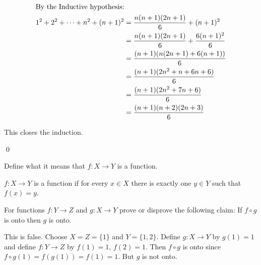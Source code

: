 \documentclass[addpoints,12pt]{exam}
\begin{document}
\begin{questions}
\begin{solution}
    \begin{align*}
      \intertext{By the Inductive hypothesis:}
      1^2 + 2^2 + \dots + n^2 + (n+1)^2 &= \frac{n(n+1)(2n+1)}{6} + (n+1)^2\\
      &= \frac{n(n+1)(2n+1)}{6} + \frac{6(n+1)^2}{6}\\
      &= \frac{(n+1) (n (2n+1) + 6(n+1))}{6}\\
      &= \frac{(n+1) (2n^2 + n + 6 n + 6)}{6}\\
      &= \frac{(n+1) (2n^2 + 7n + 6)}{6}\\
      &= \frac{(n+1)(n+2)(2n+3)}{6}
    \end{align*}

    This closes the induction.

    \qed
  \end{solution}

  \question[5] Define what it means that $f:X\to Y$ is a function.
  \vspace*{2cm}
  \begin{solution}
    $f:X\to Y$ is a function if for every $x\in X$ there is exactly one $y\in Y$
    such that $f(x) = y$.
  \end{solution}

  \question[10] For functions $f:Y\to Z$ and $g:X\to Y$ prove or disprove the
  following claim: If $f\circ g$ is onto then $g$ is onto.
  \begin{solution}
    This is false. Choose $X = Z = \{1\}$ and $Y = \{1,2\}$. Define $g:X\to Y$
    by $g(1) = 1$ and define $f:Y\to Z$ by $f(1) = 1$, $f(2)=1$. Then  $f\circ
    g$ is onto since $f\circ g (1) = f(g(1)) = f(1) = 1$. But $g$ is not onto.
  \end{solution}
\end{questions}
\end{document}
